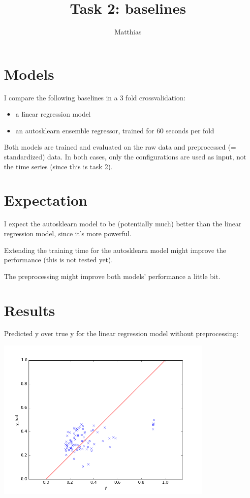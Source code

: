 \documentclass[a4paper,10pt]{article}
\title{Task 2: baselines}
\author{Matthias}
\begin{document}
\maketitle

\section{Models}

I compare the following baselines in a 3 fold crossvalidation:
\begin{itemize}
 \item a linear regression model
 \item an autosklearn ensemble regressor, trained for 60 seconds per fold
\end{itemize}

Both models are trained and evaluated on the raw data and preprocessed (= standardized) data.
In both cases, only the configurations are used as input, not the time series (since this is task 2).


\section{Expectation}

I expect the autosklearn model to be (potentially much) better than the linear regression model,
since it's more powerful.

Extending the training time for the autosklearn model might improve the performance (this is not tested yet).

The preprocessing might improve both models' performance a little bit.


\section{Results}

Predicted y over true y for the linear regression model without preprocessing:

\includegraphics[width=0.8\textwidth]{../../figures/baseline_LinearRegression_predictions}
\end{document}
